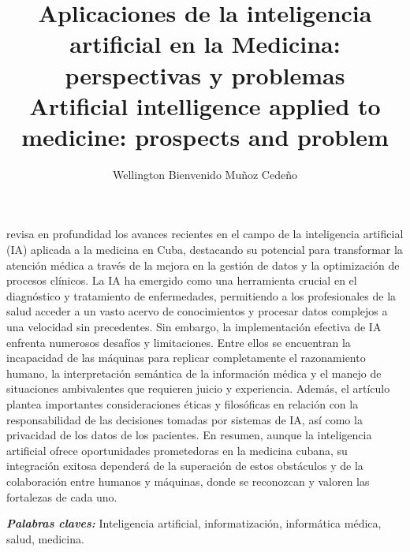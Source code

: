 \documentclass[a4paper,10pt]{article}
\title{Aplicaciones de la inteligencia artificial en la Medicina: 
perspectivas y problemas \\ \vspace{1cm} Artificial intelligence applied to medicine: prospects and problem}
\author[1,*]{Wellington Bienvenido Muñoz Cedeño}
\affil[1]{Universidad Laica "Eloy Alfaro" de Manabí, El Carmen, Ecuador}
\date{}
\renewenvironment{abstract}
 {\small
  \begin{center}
  \bfseries \abstractname\vspace{-.5em}\vspace{0pt}
  \end{center}
  \list{}{%
    \setlength{\leftmargin}{4mm}%
    \setlength{\rightmargin}{\leftmargin}%
  }%
  \item\relax}
 {\endlist}
\providecommand{\keywords}[2]
{
  \hfill \break
  \small	
  \textbf{\textit{#1:}} #2
}
\begin{document}
\maketitle
\thispagestyle{firstpage}

\begin{abstract}
revisa en profundidad los avances recientes en el campo de la inteligencia artificial (IA) aplicada a la medicina en Cuba, destacando su potencial para transformar la atención médica a través de la mejora en la gestión de datos y la optimización de procesos clínicos. La IA ha emergido como una herramienta crucial en el diagnóstico y tratamiento de enfermedades, permitiendo a los profesionales de la salud acceder a un vasto acervo de conocimientos y procesar datos complejos a una velocidad sin precedentes. Sin embargo, la implementación efectiva de IA enfrenta numerosos desafíos y limitaciones. Entre ellos se encuentran la incapacidad de las máquinas para replicar completamente el razonamiento humano, la interpretación semántica de la información médica y el manejo de situaciones ambivalentes que requieren juicio y experiencia. Además, el artículo plantea importantes consideraciones éticas y filosóficas en relación con la responsabilidad de las decisiones tomadas por sistemas de IA, así como la privacidad de los datos de los pacientes. En resumen, aunque la inteligencia artificial ofrece oportunidades prometedoras en la medicina cubana, su integración exitosa dependerá de la superación de estos obstáculos y de la colaboración entre humanos y máquinas, donde se reconozcan y valoren las fortalezas de cada uno.

    

\keywords{Palabras claves}{Inteligencia artificial, informatización, informática médica, salud, medicina.}
\end{abstract}
\end{document}
